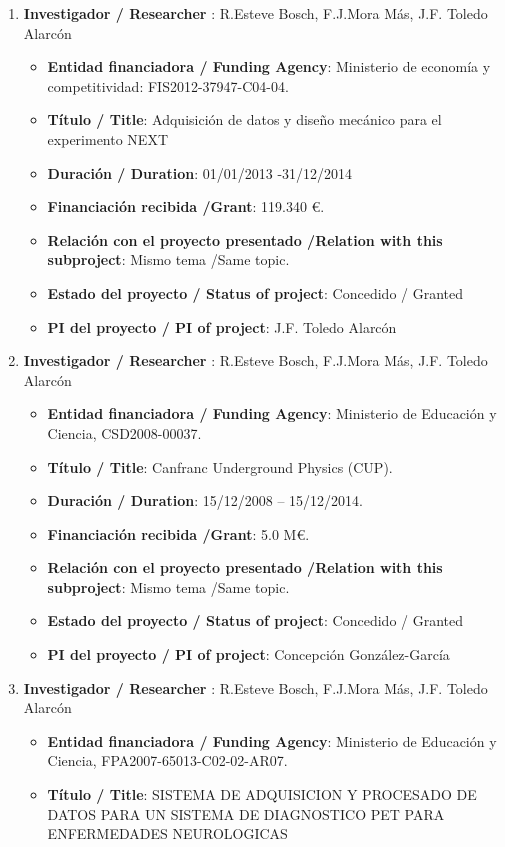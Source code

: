 \begin{enumerate}
\item {\bf Investigador / Researcher }: R.Esteve Bosch, F.J.Mora Más, J.F. Toledo Alarcón
\begin{itemize}
\item {\bf Entidad financiadora / Funding Agency}: Ministerio de economía y competitividad: FIS2012-37947-C04-04.
\item {\bf Título / Title}:  Adquisición de datos y diseño mecánico para el experimento NEXT
\item {\bf Duración / Duration}: 01/01/2013 -31/12/2014
\item {\bf Financiación recibida /Grant}: 119.340 \euro. 
\item {\bf Relación con el proyecto presentado /Relation with this subproject}: Mismo tema /Same topic. 
\item {\bf Estado del proyecto / Status of project}: Concedido / Granted
\item {\bf PI del proyecto / PI of project}: J.F. Toledo Alarcón
\end{itemize}
\item {\bf Investigador / Researcher }: R.Esteve Bosch, F.J.Mora Más, J.F. Toledo Alarcón
\begin{itemize}
\item {\bf Entidad financiadora / Funding Agency}: Ministerio de Educaci\'on y Ciencia, CSD2008-00037.
\item {\bf Título / Title}:  Canfranc Underground Physics (CUP).
\item {\bf Duración / Duration}: 15/12/2008 -- 15/12/2014. 
\item {\bf Financiación recibida /Grant}: 5.0 M\euro. 
\item {\bf Relación con el proyecto presentado /Relation with this subproject}: Mismo tema /Same topic. 
\item {\bf Estado del proyecto / Status of project}: Concedido / Granted
\item {\bf PI del proyecto / PI of project}: Concepción González-García 
\end{itemize}
\item {\bf Investigador / Researcher }: R.Esteve Bosch, F.J.Mora Más, J.F. Toledo Alarcón
\begin{itemize}
\item {\bf Entidad financiadora / Funding Agency}: Ministerio de Educaci\'on y Ciencia, FPA2007-65013-C02-02-AR07.
\item {\bf Título / Title}: SISTEMA DE ADQUISICION Y PROCESADO DE DATOS PARA UN SISTEMA DE DIAGNOSTICO PET PARA ENFERMEDADES NEUROLOGICAS

\end{itemize}
\end{enumerate}
